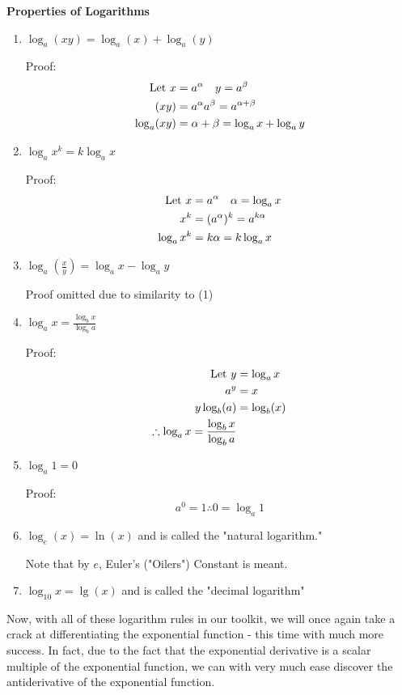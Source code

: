 \documentclass{article}
\begin{document}
{\bf{}Properties of Logarithms}
\begin{enumerate}

\item $\log_a(xy)=\log_a(x)+\log_a(y)$

Proof:
\begin{align*}
\textnormal{Let }x&=a^\alpha\quad y=a^\beta\\
(xy)&=a^\alpha a^\beta=a^{\alpha+\beta}\\
\log_a(xy)&=\alpha+\beta=\log_ax+\log_ay
\end{align*}

\item$\log_ax^k=k\log_ax$

Proof:
\begin{align*}
\textnormal{Let }x&=a^\alpha\quad\alpha=\log_ax\\
x^k&=(a^\alpha)^k=a^{k\alpha}\\
\log_ax^k&=k\alpha=k\log_ax
\end{align*}

\item $\log_a\left(\frac{x}{y}\right)=\log_ax-\log_ay$

Proof omitted due to similarity to (1)

\item $\log_ax=\frac{\log_bx}{\log_ba}$

Proof:
\begin{align*}
\textnormal{Let }y&=\log_ax\\
a^y&=x\\
y\log_b(a)&=\log_b(x)\\
\therefore\log_ax=\frac{\log_bx}{\log_ba}
\end{align*}

\item $\log_a1=0$

Proof: \[a^0=1\therefore0=\log_a1\]

\item $\log_e(x)=\ln(x)$ and is called the "natural logarithm."

Note that by $e$, Euler's ("Oilers") Constant is meant.

\item $\log_{10}x=\lg(x)$ and is called the "decimal logarithm"
\end{enumerate}

Now, with all of these logarithm rules in our toolkit, we will once again take a crack at differentiating the exponential function - this time with much more success. In fact, due to the fact that  the exponential derivative is a scalar multiple of the exponential function, we can with very much ease discover the antiderivative of the exponential function.
\end{document}
